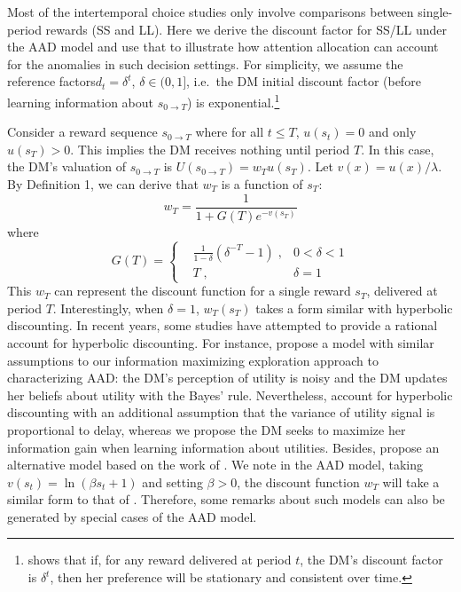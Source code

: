 \documentclass[
  12pt,
]{article}
\begin{document}
Most of the intertemporal choice studies only involve comparisons
between single-period rewards (SS and LL). Here we derive the discount
factor for SS/LL under the AAD model and use that to illustrate how
attention allocation can account for the anomalies in such decision
settings. For simplicity, we assume the reference
factors\(d_t = \delta^t\), \(\delta\in(0,1]\), i.e.~the DM initial
discount factor (before learning information about
\(s_{0\rightarrow T}\)) is exponential.\footnote{\citet{strotz1955myopia}
  shows that if, for any reward delivered at period \(t\), the DM's
  discount factor is \(\delta^t\), then her preference will be
  stationary and consistent over time.}

Consider a reward sequence \(s_{0\rightarrow T}\) where for all
\(t\leq T\), \(u(s_t)=0\) and only \(u(s_T)>0\). This implies the DM
receives nothing until period \(T\). In this case, the DM's valuation of
\(s_{0\rightarrow T}\) is \(U(s_{0\rightarrow T})=w_Tu(s_T)\). Let
\(v(x)=u(x)/\lambda\). By Definition 1, we can derive that \(w_T\) is a
function of \(s_T\):\[\tag{4}
 w_T = \frac{1}{1+G(T)e^{-v(s_T)}}
\]where\[ G(T) = \left\{ \begin{aligned} & \frac{1}{1-\delta}(\delta^{-T}-1) \; ,& 0<\delta<1\\ & T\; ,& \delta=1\ \end{aligned} \right. \]This
\(w_T\) can represent the discount function for a single reward \(s_T\),
delivered at period \(T\). Interestingly, when \(\delta=1\),
\(w_T(s_T)\) takes a form similar with hyperbolic discounting. In recent
years, some studies have attempted to provide a rational account for
hyperbolic discounting. For instance, \citet{gabaix2017myopia} propose a
model with similar assumptions to our information maximizing exploration
approach to characterizing AAD: the DM's perception of utility is noisy
and the DM updates her beliefs about utility with the Bayes' rule.
Nevertheless, \citet{gabaix2017myopia} account for hyperbolic
discounting with an additional assumption that the variance of utility
signal is proportional to delay, whereas we propose the DM seeks to
maximize her information gain when learning information about utilities.
Besides, \citet{gershman2020rationally} propose an alternative model
based on the work of \citet{gabaix2017myopia}. We note in the AAD model,
taking \(v(s_t)=\ln(\beta s_t+1)\) and setting \(\beta>0\), the discount
function \(w_T\) will take a similar form to that of
\citet{gershman2020rationally}. Therefore, some remarks about such
models can also be generated by special cases of the AAD model.
\end{document}
